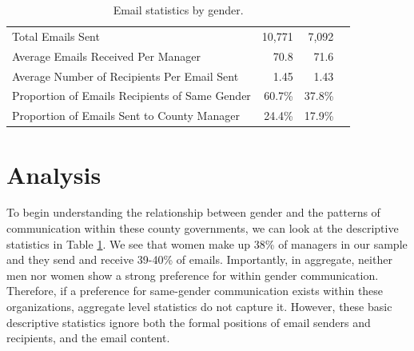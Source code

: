 \documentclass{pnastwo}
\begin{document}
\begin{article}
\begin{table}
\begin{tabular}{m{2in}rrr}
	 Total Emails Sent & 10,771 & 7,092 \\
	 Average Emails Received Per Manager & 70.8 & 71.6 \\
	 Average Number of Recipients Per Email Sent & 1.45 & 1.43 \\

	 Proportion of Emails Recipients of Same Gender & 60.7\% & 37.8\%  \\

	 Proportion of Emails Sent to County Manager & 24.4\% & 17.9\%  \\
	\bottomrule
	\end{tabular}
	\caption{\label{tab:email agg stats}Email statistics by gender.}
\end{table}


\section{Analysis} 



To begin understanding the relationship between gender and the patterns of communication within these county governments, we can look at the descriptive statistics in Table \ref{tab:email agg stats}. We see that women make up 38\% of managers in our sample and they send and receive 39-40\% of emails. Importantly, in aggregate, neither men nor women show a strong preference for within gender communication. Therefore, if a preference for same-gender communication exists within these organizations, aggregate level statistics do not capture it. However, these basic descriptive statistics ignore both the formal positions of email senders and recipients, and the email content. 


\end{article}
\end{document}

